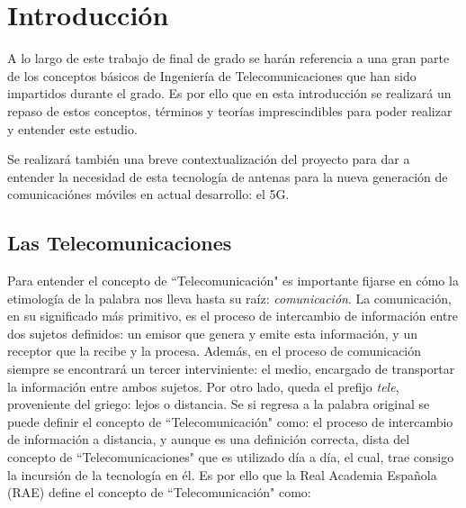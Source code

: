 
\chapter{Introducción}
\label{cap1}
\par A lo largo de este trabajo de final de grado se harán referencia a una gran parte de los conceptos básicos de Ingeniería de Telecomunicaciones que han sido impartidos durante el grado. Es por ello que en esta introducción se realizará un repaso de estos conceptos, términos y teorías imprescindibles para poder realizar y entender este estudio.
\\
\par Se realizará también una breve contextualización del proyecto para dar a entender la necesidad de esta tecnología de antenas para la nueva generación de comunicaciónes móviles en actual desarrollo: el 5G. 

\section{Las Telecomunicaciones}

\par Para entender el concepto de ``Telecomunicación" es importante fijarse en cómo la etimología de la palabra nos lleva hasta su raíz: \textit{comunicación}. La comunicación, en su significado más primitivo, es el proceso de intercambio de información entre dos sujetos definidos: un emisor que genera y emite esta información, y un receptor que la recibe y la procesa. Además, en el proceso de comunicación siempre se encontrará un tercer interviniente: el medio, encargado de transportar la información entre ambos sujetos. Por otro lado, queda el prefijo \textit{tele}, proveniente del griego: lejos o distancia. Se si regresa a la palabra original se puede definir el concepto de ``Telecomunicación" como: el proceso de intercambio de información a distancia, y aunque es una definición correcta, dista del concepto de ``Telecomunicaciones" que es utilizado día a día, el cual, trae consigo la incursión de la tecnología en él. Es por ello que la Real Academia Española (RAE) define el concepto de ``Telecomunicación" como: \cite{telecomunicacion2019}

